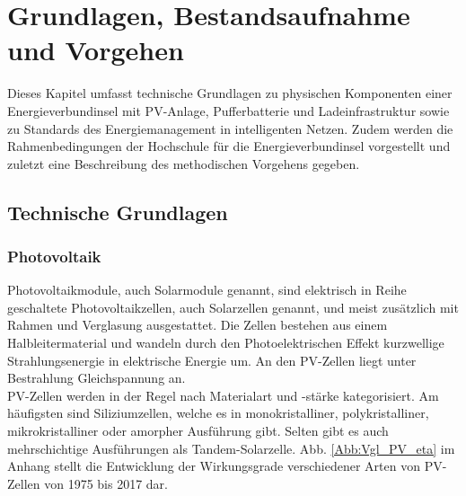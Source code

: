 \chapter{Grundlagen, Bestandsaufnahme und Vorgehen}
	\label{Kap2}
    Dieses Kapitel umfasst technische Grundlagen zu physischen Komponenten einer Energieverbundinsel mit PV-Anlage, Pufferbatterie und Ladeinfrastruktur sowie zu Standards des Energiemanagement in intelligenten Netzen. Zudem werden die Rahmenbedingungen der Hochschule für die Energieverbundinsel vorgestellt und zuletzt eine Beschreibung des methodischen Vorgehens gegeben.



	
\section{Technische Grundlagen}
	\subsection{Photovoltaik}
		\label{Kap:PV}
		Photovoltaikmodule, auch Solarmodule genannt, sind elektrisch in Reihe geschaltete Photovoltaikzellen, auch Solarzellen genannt, und meist zusätzlich mit Rahmen und Verglasung ausgestattet. Die Zellen bestehen aus einem Halbleitermaterial und wandeln durch den Photoelektrischen Effekt kurzwellige Strahlungsenergie in elektrische Energie um. An den PV-Zellen liegt unter Bestrahlung Gleichspannung an.\\
		
		PV-Zellen werden in der Regel nach Materialart und -stärke kategorisiert. Am häufigsten sind Siliziumzellen, welche es in monokristalliner, polykristalliner, mikrokristalliner oder amorpher Ausführung gibt. Selten gibt es auch mehrschichtige Ausführungen als Tandem-Solarzelle. Abb. \ref{Abb:Vgl_PV_eta} im Anhang stellt die Entwicklung der Wirkungsgrade verschiedener Arten von PV-Zellen von 1975 bis 2017 dar.\\
		
